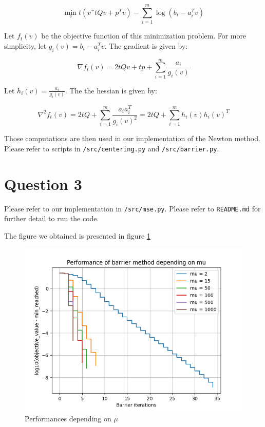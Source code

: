 \documentclass[a4paper]{article}
\begin{document}
$$
\min_v t(v¨tQv + p^Tv) - \sum_{i=1}^m\log(b_i - a_i^Tv)
$$

Let $f_t(v)$ be the objective function of this minimization problem. For more simplicity, let $g_i(v) = b_i - a_i^Tv$. The gradient is given by:

$$
\nabla f_t(v) = 2tQv + tp + \sum_{i=1}^m \frac{a_i}{g_i(v)}
$$

Let $h_i(v) = \frac{a_i}{g_i(v)}$. The the hessian is given by:

$$
\nabla^2f_t(v) = 2tQ + \sum_{i=1}^m\frac{a_ia_i^T}{g_i(v)^2} = 2tQ + \sum_{i=1}^m h_i(v)h_i(v)^T
$$

Those computations are then used in our implementation of the Newton method. Please refer to scripts in \texttt{/src/centering.py} and \texttt{/src/barrier.py}.

\section{Question 3}

Please refer to our implementation in \texttt{/src/mse.py}. Please refer to \texttt{README.md} for further detail to run the code.

The figure we obtained is presented in figure \ref{fig:muComp}

\begin{figure}[!h]
    \centering
	\includegraphics[width=1\textwidth]{figures/mu_performances.png}
	\caption{Performances depending on $\mu$ \label{fig:muComp}}
\end{figure}



%
\end{document}
